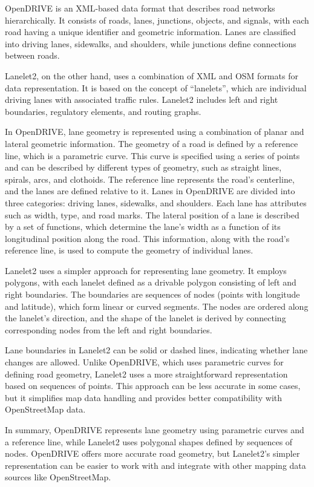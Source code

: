 OpenDRIVE is an XML-based data format that describes road networks hierarchically.
It consists of roads, lanes, junctions, objects, and signals, with each road having a unique identifier and geometric information.
Lanes are classified into driving lanes, sidewalks, and shoulders, while junctions define connections between roads.

Lanelet2, on the other hand, uses a combination of XML and OSM formats for data representation.
It is based on the concept of \enquote{lanelets}, which are individual driving lanes with associated traffic rules.
Lanelet2 includes left and right boundaries, regulatory elements, and routing graphs.

In OpenDRIVE, lane geometry is represented using a combination of planar and lateral geometric information.
The geometry of a road is defined by a reference line, which is a parametric curve.
This curve is specified using a series of points and can be described by different types of geometry, such as straight lines, spirals, arcs, and clothoids.
The reference line represents the road's centerline, and the lanes are defined relative to it.
Lanes in OpenDRIVE are divided into three categories: driving lanes, sidewalks, and shoulders.
Each lane has attributes such as width, type, and road marks.
The lateral position of a lane is described by a set of functions, which determine the lane's width as a function of its longitudinal position along the road.
This information, along with the road's reference line, is used to compute the geometry of individual lanes.

Lanelet2 uses a simpler approach for representing lane geometry.
It employs polygons, with each lanelet defined as a drivable polygon consisting of left and right boundaries.
The boundaries are sequences of nodes (points with longitude and latitude), which form linear or curved segments.
The nodes are ordered along the lanelet's direction, and the shape of the lanelet is derived by connecting corresponding nodes from the left and right boundaries.

Lane boundaries in Lanelet2 can be solid or dashed lines, indicating whether lane changes are allowed.
Unlike OpenDRIVE, which uses parametric curves for defining road geometry, Lanelet2 uses a more straightforward representation based on sequences of points.
This approach can be less accurate in some cases, but it simplifies map data handling and provides better compatibility with OpenStreetMap data.

In summary, OpenDRIVE represents lane geometry using parametric curves and a reference line, while Lanelet2 uses polygonal shapes defined by sequences of nodes.
OpenDRIVE offers more accurate road geometry, but Lanelet2's simpler representation can be easier to work with and integrate with other mapping data sources like OpenStreetMap.

